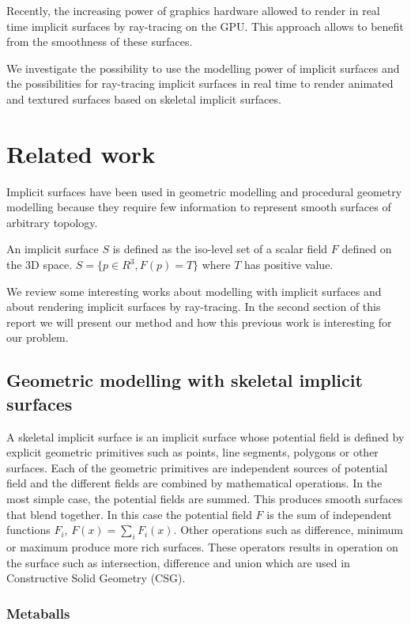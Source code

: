 \documentclass[annual]{acmsiggraph}
\begin{document}
Recently, the increasing power of graphics hardware allowed to render in real time implicit surfaces by ray-tracing on the GPU. This approach allows to benefit from the smoothness of these surfaces. 

We investigate the possibility to use the modelling power of implicit surfaces and the possibilities for ray-tracing implicit surfaces in real time to render animated and textured surfaces based on skeletal implicit surfaces.


\section{Related work}


Implicit surfaces have been used in geometric modelling and procedural geometry modelling because they require few information to represent smooth surfaces of arbitrary topology. 

An implicit surface $S$ is defined as the iso-level set of a scalar field $F$ defined on the 3D space.
$S=\{p \in R^3, F(p)=T\}$ where $T$ has positive value. 

We review some interesting works about modelling with implicit surfaces and about rendering implicit surfaces by ray-tracing.
In the second section of this report we will present our method and how this previous work is interesting for our problem.

\subsection{Geometric modelling with skeletal implicit surfaces}

A skeletal implicit surface is an implicit surface whose potential field is defined by explicit geometric primitives such as points, line segments, polygons or other surfaces. Each of the geometric primitives are independent sources of potential field and the different fields are combined by mathematical operations.
In the most simple case, the potential fields are summed. This produces smooth surfaces that blend together.
In this case the potential field $F$ is the sum of independent functions $F_i$, $F(x) = \displaystyle\sum\limits_{i} F_i(x)$.
Other operations such as difference, minimum or maximum produce more rich surfaces. These operators results in operation on the surface such as intersection, difference and union which are used in Constructive Solid Geometry (CSG). 

\subsubsection{Metaballs}
\end{document}
